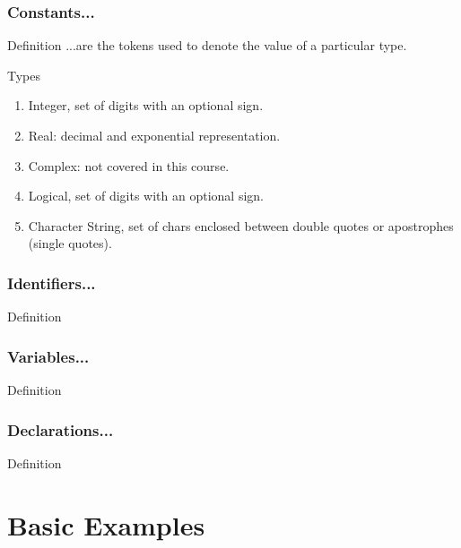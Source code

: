 \documentclass[xcolor=dvipsnames,dvip,notes=show,table]{beamer}
\begin{document}
\begin{frame}[fragile]
\frametitle{Constants...}
\scriptsize
 \begin{exampleblock}{Definition}
...are the tokens used to denote the value of a particular type.
\end{exampleblock}

 \begin{block}{Types}
 \begin{enumerate}
  \item Integer, set of digits with an optional sign. 
  \item Real: decimal and exponential representation. 
  \item Complex: not covered in this course. 
  \item Logical, set of digits with an optional sign. 
  \item Character String, set of chars enclosed between double quotes or apostrophes (single quotes).  
 \end{enumerate}

\end{block} 
 
 
\end{frame}


\begin{frame}[fragile]
\frametitle{Identifiers...}
\scriptsize
  \begin{exampleblock}{Definition}
 \end{exampleblock}
 
\end{frame}



\begin{frame}[fragile]
\frametitle{Variables...}
\scriptsize
  \begin{exampleblock}{Definition}
 \end{exampleblock}
 
\end{frame}


\begin{frame}[fragile]
\frametitle{Declarations...}
\scriptsize
  \begin{exampleblock}{Definition}
 \end{exampleblock}
 
\end{frame}


\section{Basic Examples}
\end{document}
